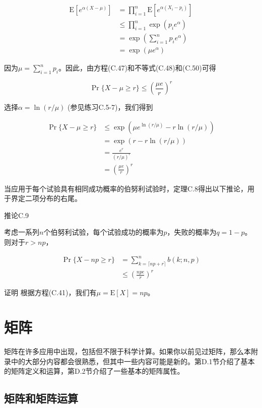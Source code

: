 \documentclass[lang=cn,newtx,10pt,scheme=chinese]{elegantbook}
\begin{document}
$$
\begin{aligned}
\mathrm{E}\left[e^{\alpha(X-\mu)}\right] & =\prod_{i=1}^n \mathrm{E}\left[e^{\alpha\left(X_i-p_i\right)}\right] \\
& \leq \prod_{i=1}^n \exp \left(p_i e^\alpha\right) \\
& =\exp \left(\sum_{i=1}^n p_i e^\alpha\right) \\
& =\exp \left(\mu e^\alpha\right)
\end{aligned}
$$

因为$\mu=\sum_{i=1}^n p_i$。因此，由方程(C.47)和不等式(C.48)和(C.50)可得

$$
\operatorname{Pr}\{X-\mu \geq r\} \leq \left(\frac{\mu e}{r}\right)^r
$$

选择$\alpha=\ln (r / \mu)$ (参见练习C.5-7)，我们得到

$$
\begin{aligned}
\operatorname{Pr}\{X-\mu \geq r\} & \leq \exp \left(\mu e^{\ln (r / \mu)}-r \ln (r / \mu)\right) \\
& =\exp (r-r \ln (r / \mu)) \\
& =\frac{e^r}{(r / \mu)^r} \\
& =\left(\frac{\mu e}{r}\right)^r
\end{aligned}
$$

当应用于每个试验具有相同成功概率的伯努利试验时，定理C.8得出以下推论，用于界定二项分布的右尾。

推论C.9

考虑一系列$n$个伯努利试验，每个试验成功的概率为$p$，失败的概率为$q=1-p$。则对于$r>n p$，

$$
\begin{aligned}
\operatorname{Pr}\{X-n p \geq r\} & =\sum_{k=\lceil n p+r\rceil}^n b(k ; n, p) \\
& \leq\left(\frac{n p e}{r}\right)^r
\end{aligned}
$$

证明 根据方程(C.41)，我们有$\mu=\mathrm{E}[X]=n p$。

\chapter{矩阵}\label{chapter:D}

矩阵在许多应用中出现，包括但不限于科学计算。如果你以前见过矩阵，那么本附录中的大部分内容都会很熟悉，但其中一些内容可能是新的。第D.1节介绍了基本的矩阵定义和运算，第D.2节介绍了一些基本的矩阵属性。

\section{矩阵和矩阵运算}\label{sectoin:D.1}
\end{document}
